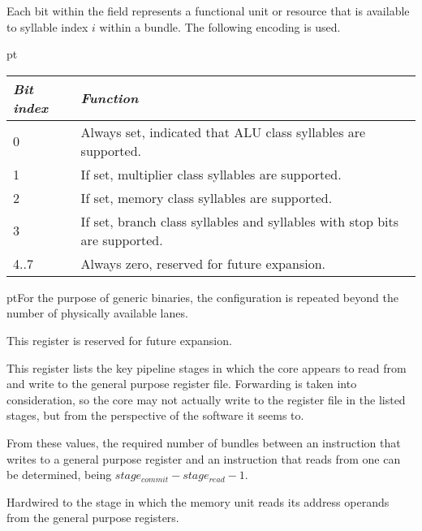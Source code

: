 Each bit within the field represents a functional unit or resource that is
available to syllable index $i$ within a bundle. The following encoding is used.

 pt\noindent\begin{tabular}{|l|p{12cm}|}
\hline
\emph{Bit index} & \emph{Function} \\
\hline
0 & Always set, indicated that ALU class syllables are supported. \\
\hline
1 & If set, multiplier class syllables are supported. \\
\hline
2 & If set, memory class syllables are supported. \\
\hline
3 & If set, branch class syllables and syllables with stop bits are supported. \\
\hline
4..7 & Always zero, reserved for future expansion. \\
\hline
\end{tabular}

 pt\noindent For the purpose of generic binaries, the configuration is 
repeated beyond the number of physically available lanes.


This register is reserved for future expansion.


This register lists the key pipeline stages in which the core appears to read
from and write to the general purpose register file. Forwarding is taken into
consideration, so the core may not actually write to the register file in the
listed stages, but from the perspective of the software it seems to.

From these values, the required number of bundles between an instruction that
writes to a general purpose register and an instruction that reads from one can
be determined, being $stage_{commit} - stage_{read} - 1$.

\reset{****}
Hardwired to the stage in which the memory unit reads its address operands from
the general purpose registers.

